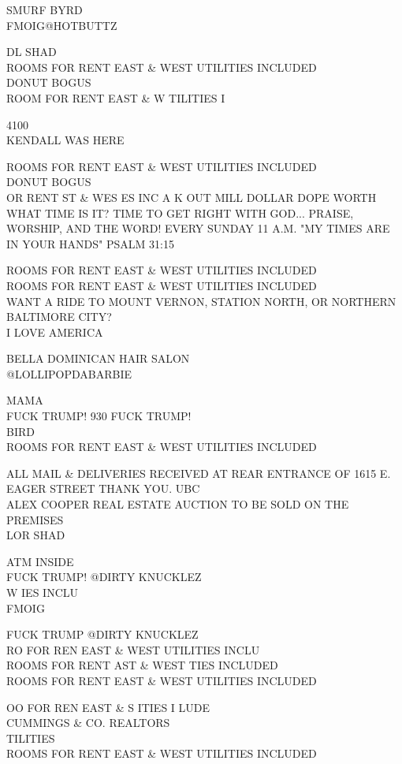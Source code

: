 \documentclass[10pt,letterpaper]{article}
\begin{document}
SMURF BYRD\\
FMOIG@HOTBUTTZ

DL SHAD\\
ROOMS FOR RENT EAST \& WEST UTILITIES INCLUDED\\
DONUT BOGUS\\
ROOM FOR RENT EAST \& W TILITIES I

4100\\
KENDALL WAS HERE

ROOMS FOR RENT EAST \& WEST UTILITIES INCLUDED\\
DONUT BOGUS\\
OR RENT ST \& WES ES INC A K OUT MILL DOLLAR DOPE WORTH\\
WHAT TIME IS IT?  TIME TO GET RIGHT WITH GOD... PRAISE, WORSHIP, AND THE WORD!  EVERY SUNDAY 11 A.M.  "MY TIMES ARE IN YOUR HANDS" PSALM 31:15

ROOMS FOR RENT EAST \& WEST UTILITIES INCLUDED\\
ROOMS FOR RENT EAST \& WEST UTILITIES INCLUDED\\
WANT A RIDE TO MOUNT VERNON, STATION NORTH, OR NORTHERN BALTIMORE CITY?\\
I LOVE AMERICA

BELLA DOMINICAN HAIR SALON\\
@LOLLIPOPDABARBIE

MAMA\\
FUCK TRUMP!  930 FUCK TRUMP!\\
BIRD\\
ROOMS FOR RENT EAST \& WEST UTILITIES INCLUDED

ALL MAIL \& DELIVERIES RECEIVED AT REAR ENTRANCE OF 1615 E. EAGER STREET THANK YOU. UBC\\
ALEX COOPER REAL ESTATE AUCTION TO BE SOLD ON THE PREMISES\\
LOR SHAD

ATM INSIDE\\
FUCK TRUMP!  @DIRTY KNUCKLEZ\\
W IES INCLU\\
FMOIG

FUCK TRUMP @DIRTY KNUCKLEZ\\
RO FOR REN EAST \& WEST UTILITIES INCLU\\
ROOMS FOR RENT AST \& WEST TIES INCLUDED\\
ROOMS FOR RENT EAST \& WEST UTILITIES INCLUDED

OO FOR REN EAST \& S ITIES I LUDE\\
CUMMINGS \& CO. REALTORS\\
TILITIES\\
ROOMS FOR RENT EAST \& WEST UTILITIES INCLUDED
\end{document}
